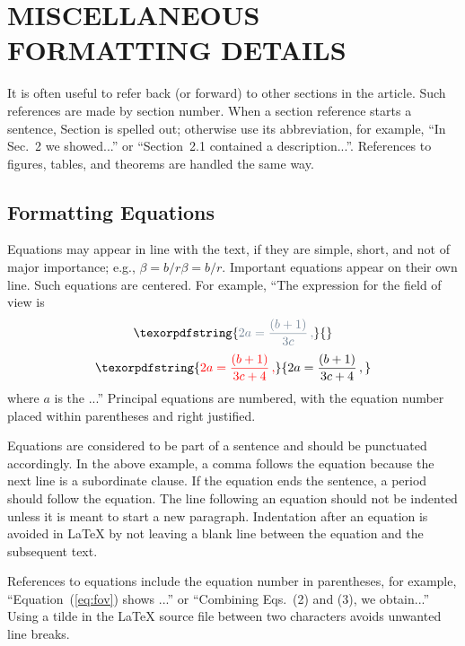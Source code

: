 \documentclass[]{spie}  %
\providecommand{\DIFaddtex}[1]{{\protect\color{red}#1}} %
\providecommand{\DIFdeltex}[1]{{\protect\color{mygrey}\scriptsize{#1}}}                       %
\providecommand{\DIFaddbegin}{} %
\providecommand{\DIFaddend}{} %
\providecommand{\DIFdelbegin}{} %
\providecommand{\DIFdelend}{} %
\providecommand{\DIFadd}[1]{\texorpdfstring{\DIFaddtex{#1}}{#1}} %
\providecommand{\DIFdel}[1]{\texorpdfstring{\DIFdeltex{#1}}{}} %
\newcommand{\DIFscaledelfig}{0.5}
\newlength{\DIFdelgraphicswidth} %
\newlength{\DIFdelgraphicsheight} %
\newcommand{\DIFaddincludegraphics}[2][]{{\color{blue}\fbox{\DIFOincludegraphics[#1]{#2}}}} %
\newcommand{\DIFdelincludegraphics}[2][]{%
\sbox{\DIFdelgraphicsbox}{\DIFOincludegraphics[#1]{#2}}%
\settoboxwidth{\DIFdelgraphicswidth}{\DIFdelgraphicsbox} %
\settoboxtotalheight{\DIFdelgraphicsheight}{\DIFdelgraphicsbox} %
\scalebox{\DIFscaledelfig}{%
\parbox[b]{\DIFdelgraphicswidth}{\usebox{\DIFdelgraphicsbox}\\[-\baselineskip] \rule{\DIFdelgraphicswidth}{0em}}\llap{\resizebox{\DIFdelgraphicswidth}{\DIFdelgraphicsheight}{%
\setlength{\unitlength}{\DIFdelgraphicswidth}%
\begin{picture}(1,1)%
\thicklines\linethickness{2pt} %
{\color[rgb]{1,0,0}\put(0,0){\framebox(1,1){}}}%
{\color[rgb]{1,0,0}\put(0,0){\line( 1,1){1}}}%
{\color[rgb]{1,0,0}\put(0,1){\line(1,-1){1}}}%
\end{picture}%
}\hspace*{3pt}}} %
} %
\DeclareRobustCommand{\DIFaddbegin}{\DIFOaddbegin \let\includegraphics\DIFaddincludegraphics} %
\DeclareRobustCommand{\DIFaddend}{\DIFOaddend \let\includegraphics\DIFOincludegraphics} %
\DeclareRobustCommand{\DIFdelbegin}{\DIFOdelbegin \let\includegraphics\DIFdelincludegraphics} %
\DeclareRobustCommand{\DIFdelend}{\DIFOaddend \let\includegraphics\DIFOincludegraphics} %
\begin{document}
\appendix    %

\section{MISCELLANEOUS FORMATTING DETAILS}
\label{sec:misc}

It is often useful to refer back (or forward) to other sections in the article.  Such references are made by section number.  When a section reference starts a sentence, Section is spelled out; otherwise use its abbreviation, for example, ``In Sec.~2 we showed...'' or ``Section~2.1 contained a description...''.  References to figures, tables, and theorems are handled the same way.

\subsection{Formatting Equations}
Equations may appear in line with the text, if they are simple, short, and not of major 
importance; e.g., \DIFdelbegin \DIFdel{$\beta = b/r$}\DIFdelend \DIFaddbegin \DIFadd{\(\beta = b/r\)}\DIFaddend .  Important equations appear on their own line.  Such 
equations are centered.  For example, ``The expression for the field of view is
\DIFdelbegin \begin{displaymath}
\DIFdel{%
2 a = \frac{(b + 1)}{3c} \, ,
}\end{displaymath}%
\DIFdelend \DIFaddbegin \begin{equation}
\DIFadd{\label{eq:fov}
2 a = \frac{(b + 1)}{3c+4} \, ,
}\end{equation}\DIFaddend 
where $a$ is the ...'' Principal equations are numbered, with the equation number placed within parentheses and right justified.  

Equations are considered to be part of a sentence and should be punctuated accordingly. In the above example, a comma follows the equation because the next line is a subordinate clause.  If the equation ends the sentence, a period should follow the equation.  The line following an equation should not be indented unless it is meant to start a new paragraph.  Indentation after an equation is avoided in LaTeX by not leaving a blank line between the equation and the subsequent text.

References to equations include the equation number in parentheses, for example, ``Equation~(\ref{eq:fov}) shows ...'' or ``Combining Eqs.~(2) and (3), we obtain...''  Using a tilde in the LaTeX source file between two characters avoids unwanted line breaks.
\end{document}
